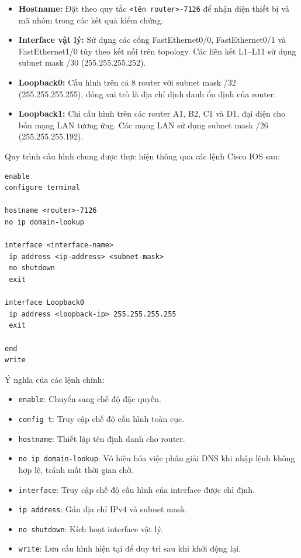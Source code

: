 \begin{itemize}
    \item \textbf{Hostname:}
    Đặt theo quy tắc
    \texttt{<tên router>-7126}
    để nhận diện thiết bị và mã nhóm
    trong các kết quả kiểm chứng.

    \item \textbf{Interface vật lý:}
    Sử dụng các cổng FastEthernet0/0,
    FastEthernet0/1 và FastEthernet1/0
    tùy theo kết nối trên topology.
    Các liên kết L1--L11 sử dụng
    subnet mask /30
    (255.255.255.252).

    \item \textbf{Loopback0:}
    Cấu hình trên cả 8 router với
    subnet mask /32
    (255.255.255.255),
    đóng vai trò là địa chỉ định danh
    ổn định của router.

    \item \textbf{Loopback1:}
    Chỉ cấu hình trên các router
    A1, B2, C1 và D1,
    đại diện cho bốn mạng LAN
    tương ứng. Các mạng LAN
    sử dụng subnet mask /26
    (255.255.255.192).
\end{itemize}

Quy trình cấu hình chung được thực hiện
thông qua các lệnh Cisco IOS sau:

\begin{lstlisting}
enable
configure terminal

hostname <router>-7126
no ip domain-lookup

interface <interface-name>
 ip address <ip-address> <subnet-mask>
 no shutdown
 exit

interface Loopback0
 ip address <loopback-ip> 255.255.255.255
 exit

end
write
\end{lstlisting}

Ý nghĩa của các lệnh chính:

\begin{itemize}
    \item \texttt{enable}:
    Chuyển sang chế độ đặc quyền.

    \item \texttt{config t}:
    Truy cập chế độ cấu hình toàn cục.

    \item \texttt{hostname}:
    Thiết lập tên định danh cho router.

    \item \texttt{no ip domain-lookup}:
    Vô hiệu hóa việc phân giải DNS
    khi nhập lệnh không hợp lệ,
    tránh mất thời gian chờ.

    \item \texttt{interface}:
    Truy cập chế độ cấu hình của
    interface được chỉ định.

    \item \texttt{ip address}:
    Gán địa chỉ IPv4 và subnet mask.

    \item \texttt{no shutdown}:
    Kích hoạt interface vật lý.

    \item \texttt{write}:
    Lưu cấu hình hiện tại để duy trì sau khi khởi động lại.
\end{itemize}


